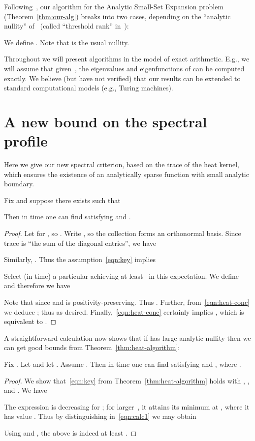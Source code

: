\documentclass[11pt]{article}
\begin{document}
Following~\cite{ABS10}, our algorithm for the Analytic Small-Set Expansion problem (Theorem~\ref{thm:our-alg}) breaks into two cases, depending on the ``analytic nullity'' of~ (called ``threshold rank'' in~\cite{ABS10}):
\begin{definition}
    We define .  Note that  is the usual nullity.
\end{definition}

\begin{remark}
Throughout we will present algorithms in the model of exact arithmetic. E.g., we will assume that given~, the eigenvalues and eigenfunctions of  can be computed exactly.  We believe (but have not verified) that our results can be extended to standard computational models (e.g., Turing machines).
\end{remark}

\section{A new bound on the spectral profile}

Here we give our new spectral criterion, based on the trace of the heat kernel, which ensures the existence of an analytically sparse function with small analytic boundary.
\begin{theorem}                                     \label{thm:heat-algorithm}
    Fix   and suppose there exists  such that
    
    Then in  time one can find  satisfying  and .
\end{theorem}
\begin{proof}
    Let  for , so .  Write , so the collection  forms an orthonormal basis.  Since trace is ``the sum of the diagonal entries'', we have
    
    Similarly, .
    Thus the assumption~\eqref{eqn:key} implies
    
    Select (in  time) a particular  achieving at least~ in this expectation.  We define  and therefore we have
    
    Note that  since  and  is positivity-preserving.  Thus .  Further, from~\eqref{eqn:heat-conc} we deduce ; thus  as desired.  Finally,~\eqref{eqn:heat-conc} certainly implies , which is equivalent to .
\end{proof}

A straightforward calculation now shows that if  has large analytic nullity then we can get good bounds from Theorem~\ref{thm:heat-algorithm}:
\begin{corollary}                                       \label{cor:nullity-to-trace}
    Fix .  Let  and let .  Assume .  Then in  time one can find  satisfying  and , where .
\end{corollary}
\begin{proof}
    We show that~\eqref{eqn:key} from Theorem~\ref{thm:heat-algorithm} holds with , , and .  We have
    
    The expression  is decreasing for ; for larger~, it attains its minimum at , where it has value .  Thus by distinguishing  in~\eqref{eqn:calc1} we may obtain
    
    Using  and , the above is indeed at least .
\end{proof}
\end{document}
